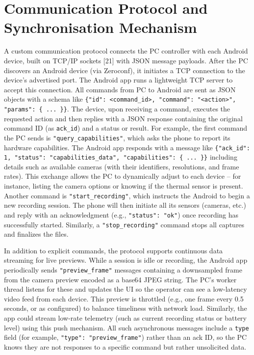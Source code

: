 \section{Communication Protocol and Synchronisation Mechanism}\label{sec:4-4}
A custom communication protocol connects the PC controller with each Android device, built on TCP/IP sockets [21] with JSON message payloads. After the PC discovers an Android device (via Zeroconf), it initiates a TCP connection to the device's advertised port. The Android app runs a lightweight TCP server to accept this connection. All commands from PC to Android are sent as JSON objects with a schema like \texttt{\{"id": <command\_id>, "command": "<action>", "params": \{ ... \}\}}. The device, upon receiving a command, executes the requested action and then replies with a JSON response containing the original command ID (as \texttt{ack\_id}) and a status or result. For example, the first command the PC sends is \texttt{"query\_capabilities"}, which asks the phone to report its hardware capabilities. The Android app responds with a message like \texttt{\{"ack\_id": 1, "status": "capabilities\_data", "capabilities": \{ ... \}\}} including details such as available cameras (with their identifiers, resolutions, and frame rates). This exchange allows the PC to dynamically adjust to each device -- for instance, listing the camera options or knowing if the thermal sensor is present. Another command is \texttt{"start\_recording"}, which instructs the Android to begin a new recording session. The phone will then initiate all its sensors (cameras, etc.) and reply with an acknowledgment (e.g., \texttt{"status": "ok"}) once recording has successfully started. Similarly, a \texttt{"stop\_recording"} command stops all captures and finalizes the files.

In addition to explicit commands, the protocol supports continuous data streaming for live previews. While a session is idle or recording, the Android app periodically sends \texttt{"preview\_frame"} messages containing a downsampled frame from the camera preview encoded as a base64 JPEG string. The PC's worker thread listens for these and updates the UI so the operator can see a low-latency video feed from each device. This preview is throttled (e.g., one frame every 0.5 seconds, or as configured) to balance timeliness with network load. Similarly, the app could stream low-rate telemetry (such as current recording status or battery level) using this push mechanism. All such asynchronous messages include a \texttt{type} field (for example, \texttt{"type": "preview\_frame"}) rather than an ack ID, so the PC knows they are not responses to a specific command but rather unsolicited data.

